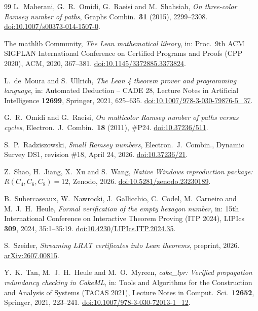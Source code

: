 \begin{thebibliography}{99}
L.~Maherani, G.~R.~Omidi, G.~Raeisi and M.~Shahsiah, \emph{On three-color
Ramsey number of paths}, Graphs Combin.\ \textbf{31} (2015), 2299--2308.
\href{https://doi.org/10.1007/s00373-014-1507-0}{doi:10.1007/s00373-014-1507-0}.

The mathlib Community, \emph{The Lean mathematical library}, in: Proc.\
9th ACM SIGPLAN International Conference on Certified Programs and Proofs
(CPP 2020), ACM, 2020, 367--381.
\href{https://doi.org/10.1145/3372885.3373824}{doi:10.1145/3372885.3373824}.

L.~de~Moura and S.~Ullrich, \emph{The Lean 4 theorem prover and
programming language}, in: Automated Deduction -- CADE 28, Lecture Notes
in Artificial Intelligence \textbf{12699}, Springer, 2021, 625--635.
\href{https://doi.org/10.1007/978-3-030-79876-5_37}{doi:10.1007/978-3-030-79876-5\_37}.

G.~R.~Omidi and G.~Raeisi, \emph{On multicolor Ramsey number of paths versus
cycles}, Electron.\ J.\ Combin.\ \textbf{18} (2011), \#P24.
\href{https://doi.org/10.37236/511}{doi:10.37236/511}.

S.~P.~Radziszowski, \emph{Small Ramsey numbers}, Electron.\ J.\ Combin.,
Dynamic Survey DS1, revision \#18, April 24, 2026.
\href{https://doi.org/10.37236/21}{doi:10.37236/21}.

Z.~Shao, H.~Jiang, X.~Xu and S.~Wang, \emph{Native Windows reproduction
package: $R(C_4,C_6,C_8)=12$}, Zenodo, 2026.
\href{https://doi.org/10.5281/zenodo.23230189}{doi:10.5281/zenodo.23230189}.

B.~Subercaseaux, W.~Nawrocki, J.~Gallicchio, C.~Codel, M.~Carneiro and
M.~J.~H.~Heule, \emph{Formal verification of the empty hexagon number},
in: 15th International Conference on Interactive Theorem Proving (ITP
2024), LIPIcs \textbf{309}, 2024, 35:1--35:19.
\href{https://doi.org/10.4230/LIPIcs.ITP.2024.35}{doi:10.4230/LIPIcs.ITP.2024.35}.

S.~Szeider, \emph{Streaming LRAT certificates into Lean theorems},
preprint, 2026. \href{https://arxiv.org/abs/2607.00815}{arXiv:2607.00815}.

Y.~K.~Tan, M.~J.~H.~Heule and M.~O.~Myreen, \emph{cake\_lpr: Verified
propagation redundancy checking in CakeML}, in: Tools and Algorithms for
the Construction and Analysis of Systems (TACAS 2021), Lecture Notes in
Comput.\ Sci.\ \textbf{12652}, Springer, 2021, 223--241.
\href{https://doi.org/10.1007/978-3-030-72013-1_12}{doi:10.1007/978-3-030-72013-1\_12}.


\end{thebibliography}
